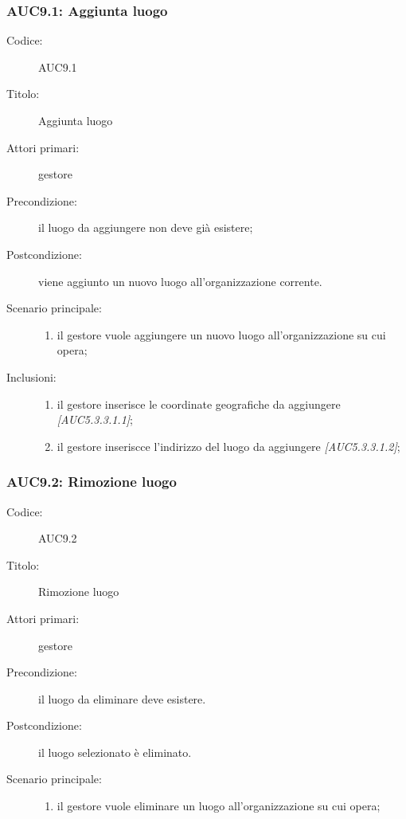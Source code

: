 \documentclass[../../../analisi-dei-requisiti.tex]{subfiles}
\begin{document}
\subsubsection{AUC9.1: Aggiunta luogo}%
\label{subs:AUC9.1}
\begin{description}
  \item[Codice:] AUC9.1
  \item[Titolo:] Aggiunta luogo
  \item[Attori primari:] gestore
  \item[Precondizione:] il luogo da aggiungere non deve già esistere;
  \item[Postcondizione:] viene aggiunto un nuovo luogo all'organizzazione corrente.
  \item[Scenario principale:]
  \begin{enumerate}
    \item il gestore vuole aggiungere un nuovo luogo all'organizzazione su cui opera;
  \end{enumerate}
  \item[Inclusioni:]
  \begin{enumerate}
    \item il gestore inserisce le coordinate geografiche da aggiungere \emph{[AUC5.3.3.1.1]};
    \item il gestore inseriscce l'indirizzo del luogo da aggiungere \emph{[AUC5.3.3.1.2]};
  \end{enumerate}
\end{description}

\subsubsection{AUC9.2: Rimozione luogo}%
\label{subs:AUC9.2}
\begin{description}
  \item[Codice:] AUC9.2
  \item[Titolo:] Rimozione luogo
  \item[Attori primari:] gestore
  \item[Precondizione:] il luogo da eliminare deve esistere.
  \item[Postcondizione:] il luogo selezionato è eliminato.
  \item[Scenario principale:]
  \begin{enumerate}
    \item il gestore vuole eliminare un luogo all'organizzazione su cui opera;
  \end{enumerate}
\end{description}
\end{document}
